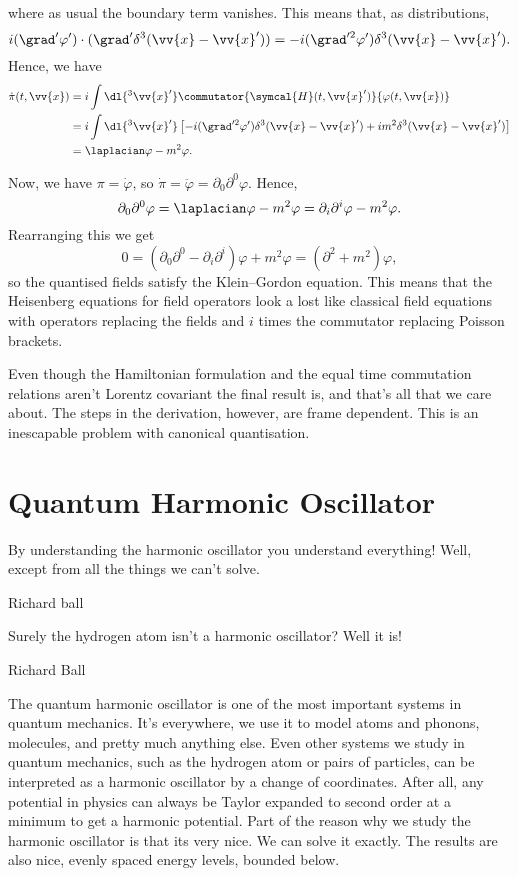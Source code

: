 \documentclass[fleqn]{NotesClass}
\newcommand{\dalembertian}{\partial^2}
\newcommand{\hamiltonianDensity}{\symcal{H}}
\begin{document}
    where as usual the boundary term vanishes.
    This means that, as distributions,
    \begin{equation}
        i(\grad'\varphi') \cdot (\grad'\delta^3(\vv{x} - \vv{x}')) = -i(\grad'^2\varphi')\delta^3(\vv{x} - \vv{x}').
    \end{equation}
    Hence, we have
    \begin{align}
        \dot{\pi}(t, \vv{x}) &= i \int \dl{^3\vv{x}'} \commutator{\hamiltonianDensity(t, \vv{x}')}{\varphi(t, \vv{x})}\\
        &= i \int \dl{^3\vv{x}'} \left[ -i(\grad'^2\varphi') \delta^3(\vv{x} - \vv{x}') + im^2 \delta^3(\vv{x} - \vv{x}')\right]\\
        &= \laplacian\varphi - m^2\varphi.
    \end{align}
    
    Now, we have \(\pi = \dot{\varphi}\), so \(\dot{\pi} = \ddot{\varphi} = \partial_0\partial^0 \varphi\).
    Hence,
    \begin{equation}
        \partial_0\partial^0 \varphi = \laplacian\varphi - m^2\varphi = \partial_i\partial^i \varphi - m^2\varphi.
    \end{equation}
    Rearranging this we get
    \begin{equation}
        0 = (\partial_0\partial^0 - \partial_i\partial^i)\varphi + m^2\varphi = (\dalembertian + m^2)\varphi,
    \end{equation}
    so the quantised fields satisfy the Klein--Gordon equation.
    This means that the Heisenberg equations for field operators look a lost like classical field equations with operators replacing the fields and \(i\) times the commutator replacing Poisson brackets.
    
    Even though the Hamiltonian formulation and the equal time commutation relations aren't Lorentz covariant the final result is, and that's all that we care about.
    The steps in the derivation, however, are frame dependent.
    This is an inescapable problem with canonical quantisation.
    
    \chapter{Quantum Harmonic Oscillator}
    \epigraph{By understanding the harmonic oscillator you understand everything! Well, except from all the things we can't solve.}{Richard ball}
    \epigraph{Surely the hydrogen atom isn't a harmonic oscillator? Well it is!}{Richard Ball}
    The quantum harmonic oscillator is one of the most important systems in quantum mechanics.
    It's everywhere, we use it to model atoms and phonons, molecules, and pretty much anything else.
    Even other systems we study in quantum mechanics, such as the hydrogen atom or pairs of particles, can be interpreted as a harmonic oscillator by a change of coordinates.
    After all, any potential in physics can always be Taylor expanded to second order at a minimum to get a harmonic potential.
    Part of the reason why we study the harmonic oscillator is that its very nice.
    We can solve it exactly.
    The results are also nice, evenly spaced energy levels, bounded below.
    
\end{document}
